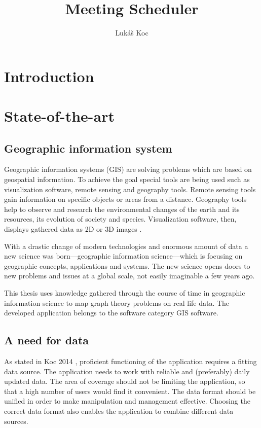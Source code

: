\documentclass[thesis=M,english]{FITthesis}[2012/10/20]
\title{Meeting Scheduler}
\author{Luk{\' a}{\v s} Koc} %
\begin{document}

\chapter{Introduction}


\chapter{State-of-the-art}

\section{Geographic information system}
Geographic information systems (GIS) are solving problems which are based on geospatial information. To achieve the goal special tools are being used such as visualization software, remote sensing and geography tools. Remote sensing tools gain information on specific objects or areas from a distance. Geography tools help to observe and research the environmental changes of the earth and its resources, its evolution of society and species. Visualization software, then, displays gathered data as 2D or 3D images \cite{Chen10}.

With a drastic change of modern technologies and enormous amount of data a new science was born---geographic information science---which is focusing on geographic concepts, applications and systems. The new science opens doors to new problems and issues at a global scale, not easily imaginable a few years ago. 

This thesis uses knowledge gathered through the course of time in geographic information science to map graph theory problems on real life data. The developed application belongs to the software category GIS software. 

\section{A need for data}
\label{S1: Good data}
As stated in Koc 2014 \cite{Koc14}, proficient functioning of the application requires a fitting data source. The application needs to work with reliable and (preferably) daily updated data. The area of coverage should not be limiting the application, so that a high number of users would find it convenient. The data format should be unified in order to make manipulation and management effective. Choosing the correct data format also enables the application to combine different data sources.
\end{document}
